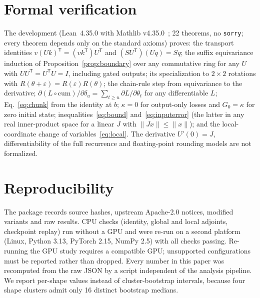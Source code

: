 \section{Formal verification}\label{app:lean}
The development (Lean~4.35.0 with Mathlib v4.35.0~\cite{lean4,mathlib}; 22 theorems, no \texttt{sorry}; every theorem depends only on the standard axioms) proves: the transport identities $v(Uk)^{\mathsf T}=(vk^{\mathsf T})U^{\mathsf T}$ and $(SU^{\mathsf T})(Uq)=Sq$; the suffix equivariance induction of Proposition~\ref{prop:boundary} over any commutative ring for any $U$ with $UU^{\mathsf T}=U^{\mathsf T}U=I$, including gated outputs; its specialization to $2\times2$ rotations with $R(\theta+\varepsilon)=R(\varepsilon)R(\theta)$; the chain-rule step from equivariance to the derivative; $\partial(L\circ\mathrm{cum})/\partial\delta_u=\sum_{t\ge u}\partial L/\partial\theta_t$ for any differentiable $L$; Eq.~\eqref{eq:chunk} from the identity at $b$; $\kappa=0$ for output-only losses and $G_0=\kappa$ for zero initial state; inequalities~\eqref{eq:bound} and~\eqref{eq:inputerror} (the latter in any real inner-product space for a linear $J$ with $\|Jx\|\le\|x\|$); and the local-coordinate change of variables~\eqref{eq:local}. The derivative $U'(0)=J$, differentiability of the full recurrence and floating-point rounding models are not formalized.

\section{Reproducibility}
The package records source hashes, upstream Apache-2.0 notices, modified variants and raw results. CPU checks (identity, global and local adjoints, checkpoint replay) run without a GPU and were re-run on a second platform (Linux, Python 3.13, PyTorch 2.15, NumPy 2.5) with all checks passing. Re-running the GPU study requires a compatible GPU; unsupported configurations must be reported rather than dropped. Every number in this paper was recomputed from the raw JSON by a script independent of the analysis pipeline. We report per-shape values instead of cluster-bootstrap intervals, because four shape clusters admit only 16 distinct bootstrap medians.

